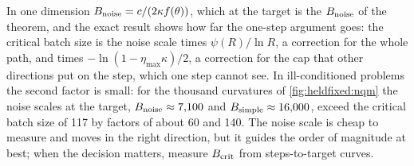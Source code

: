 \begin{refsection}
In one dimension $B_{\mathrm{noise}}=c/(2\kappa f(\theta))$, which at the target is the $B_{\mathrm{noise}}$ of the theorem, and the exact result shows how far the one-step argument goes: the critical batch size is the noise scale times $\psi(R)/\ln R$, a correction for the whole path, and times $-\ln(1-\eta_{\max}\kappa)/2$, a correction for the cap that other directions put on the step, which one step cannot see. In ill-conditioned problems the second factor is small: for the thousand curvatures of \cref{fig:heldfixed:nqm} the noise scales at the target, $B_{\mathrm{noise}}\approx7{,}100$ and $B_{\mathrm{simple}}\approx16{,}000$, exceed the critical batch size of 117 by factors of about 60 and 140. The noise scale is cheap to measure and moves in the right direction, but it guides the order of magnitude at best; when the decision matters, measure $B_{\mathrm{crit}}$ from steps-to-target curves.


\end{refsection}
